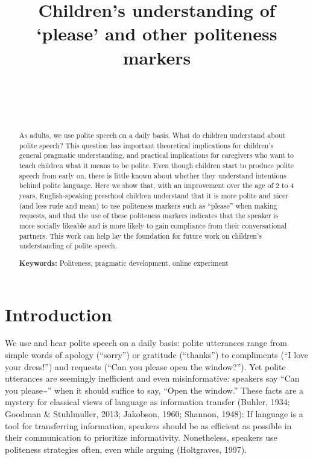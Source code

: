 \documentclass[10pt, letterpaper]{article}
\title{Children's understanding of `please' and other politeness markers}
\author{{\large \bf } \\ \texttt{} \\  \\}
\begin{document}
\maketitle

\begin{abstract}
As adults, we use polite speech on a daily basis. What do children
understand about polite speech? This question has important theoretical
implications for children's general pragmatic understanding, and
practical implications for caregivers who want to teach children what it
means to be polite. Even though children start to produce polite speech
from early on, there is little known about whether they understand
intentions behind polite language. Here we show that, with an
improvement over the age of 2 to 4 years, English-speaking preschool
children understand that it is more polite and nicer (and less rude and
mean) to use politeness markers such as ``please'' when making requests,
and that the use of these politeness markers indicates that the speaker
is more socially likeable and is more likely to gain compliance from
their conversational partners. This work can help lay the foundation for
future work on children's understanding of polite speech.

\textbf{Keywords:}
Politeness, pragmatic development, online experiment
\end{abstract}

\section{Introduction}\label{introduction}

We use and hear polite speech on a daily basis: polite utterances range
from simple words of apology (``sorry'') or gratitude (``thanks'') to
compliments (``I love your dress!'') and requests (``Can you please open
the window?''). Yet polite utterances are seemingly inefficient and even
misinformative: speakers say ``Can you please\textasciitilde{}'' when it
should suffice to say, ``Open the window.'' These facts are a mystery
for classical views of language as information transfer (Buhler, 1934;
Goodman \& Stuhlmuller, 2013; Jakobson, 1960; Shannon, 1948): If
language is a tool for transferring information, speakers should be as
efficient as possible in their communication to prioritize
informativity. Nonetheless, speakers use politeness strategies often,
even while arguing (Holtgraves, 1997).
\end{document}
